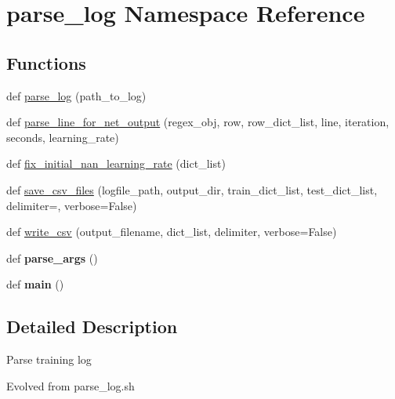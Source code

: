 \hypertarget{namespaceparse__log}{}\section{parse\+\_\+log Namespace Reference}
\label{namespaceparse__log}
\subsection*{Functions}
\begin{DoxyCompactItemize}
\item 
def \mbox{\hyperlink{namespaceparse__log_ac340d5a4faf6c29869b3702916e3f237}{parse\+\_\+log}} (path\+\_\+to\+\_\+log)
\item 
def \mbox{\hyperlink{namespaceparse__log_a140116e322b21ebd36d194b65a5612fb}{parse\+\_\+line\+\_\+for\+\_\+net\+\_\+output}} (regex\+\_\+obj, row, row\+\_\+dict\+\_\+list, line, iteration, seconds, learning\+\_\+rate)
\item 
def \mbox{\hyperlink{namespaceparse__log_a407b810ae0d4a92efe08385f7de5eabb}{fix\+\_\+initial\+\_\+nan\+\_\+learning\+\_\+rate}} (dict\+\_\+list)
\item 
def \mbox{\hyperlink{namespaceparse__log_a6541ec62fedcd2928543ff22ec4401b3}{save\+\_\+csv\+\_\+files}} (logfile\+\_\+path, output\+\_\+dir, train\+\_\+dict\+\_\+list, test\+\_\+dict\+\_\+list, delimiter=\textquotesingle{}, verbose=False)
\item 
def \mbox{\hyperlink{namespaceparse__log_a485ed97888fccc67e8067cb51ce03db4}{write\+\_\+csv}} (output\+\_\+filename, dict\+\_\+list, delimiter, verbose=False)
\item 
\mbox{\label{namespaceparse__log_a2db1ba247c658a76a2b26481d6d27c62}} 
def {\bfseries parse\+\_\+args} ()
\item 
\mbox{\label{namespaceparse__log_ada5ddccd0e1bc3f33fd58f2fbee4ed8f}} 
def {\bfseries main} ()
\end{DoxyCompactItemize}


\subsection{Detailed Description}
\begin{DoxyVerb}Parse training log

Evolved from parse_log.sh
\end{DoxyVerb}
 

